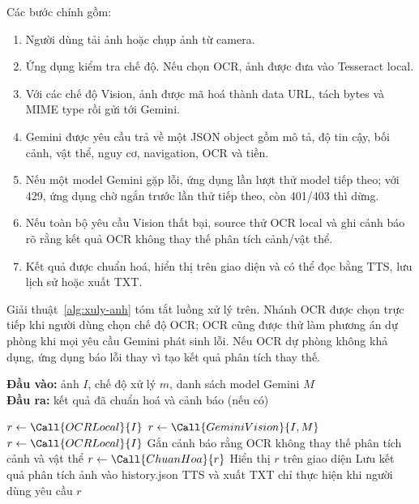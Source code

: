 Các bước chính gồm:
\begin{enumerate}[leftmargin=1.8em, itemsep=3pt]
  \item Người dùng tải ảnh hoặc chụp ảnh từ camera.
  \item Ứng dụng kiểm tra chế độ. Nếu chọn OCR, ảnh được đưa vào Tesseract local.
  \item Với các chế độ Vision, ảnh được mã hoá thành data URL, tách bytes và MIME type rồi gửi tới Gemini.
  \item Gemini được yêu cầu trả về một JSON object gồm mô tả, độ tin cậy, bối cảnh, vật thể, nguy cơ, navigation, OCR và tiền.
  \item Nếu một model Gemini gặp lỗi, ứng dụng lần lượt thử model tiếp theo; với 429, ứng dụng chờ ngắn trước lần thử tiếp theo, còn 401/403 thì dừng.
  \item Nếu toàn bộ yêu cầu Vision thất bại, source thử OCR local và ghi cảnh báo rõ rằng kết quả OCR không thay thế phân tích cảnh/vật thể.
  \item Kết quả được chuẩn hoá, hiển thị trên giao diện và có thể đọc bằng TTS, lưu lịch sử hoặc xuất TXT.
\end{enumerate}

Giải thuật~\ref{alg:xuly-anh} tóm tắt luồng xử lý trên. Nhánh OCR được chọn
trực tiếp khi người dùng chọn chế độ OCR; OCR cũng được thử làm phương án dự
phòng khi mọi yêu cầu Gemini phát sinh lỗi. Nếu OCR dự phòng không khả dụng,
ứng dụng báo lỗi thay vì tạo kết quả phân tích thay thế.

\begin{algorithm}[H]
\caption{Xử lý ảnh theo chế độ OCR hoặc Vision}
\label{alg:xuly-anh}
\hspace*{\algorithmicindent}\textbf{Đầu vào:} ảnh $I$, chế độ xử lý $m$, danh sách model Gemini $M$\\
\hspace*{\algorithmicindent}\textbf{Đầu ra:} kết quả đã chuẩn hoá và cảnh báo (nếu có)
\begin{algorithmic}[1]
    \State $r \gets \Call{OCRLocal}{I}$
  \Else
    \State $r \gets \Call{GeminiVision}{I, M}$
      \State $r \gets \Call{OCRLocal}{I}$
      \State Gắn cảnh báo rằng OCR không thay thế phân tích cảnh và vật thể
    \EndIf
  \EndIf
  \State $r \gets \Call{ChuanHoa}{r}$
  \State Hiển thị $r$ trên giao diện
  \State Lưu kết quả phân tích ảnh vào history.json
  \State TTS và xuất TXT chỉ thực hiện khi người dùng yêu cầu
  \State \Return $r$
\EndFunction
\end{algorithmic}
\end{algorithm}

